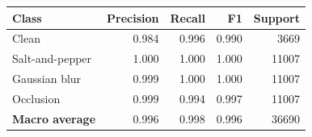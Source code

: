 \begin{tabular}{lrrrr}
\toprule
Class & Precision & Recall & F1 & Support \\
\midrule
Clean & 0.984 & 0.996 & 0.990 & 3669 \\
Salt-and-pepper & 1.000 & 1.000 & 1.000 & 11007 \\
Gaussian blur & 0.999 & 1.000 & 1.000 & 11007 \\
Occlusion & 0.999 & 0.994 & 0.997 & 11007 \\
\textbf{Macro average} & 0.996 & 0.998 & 0.996 & 36690 \\
\bottomrule
\end{tabular}
